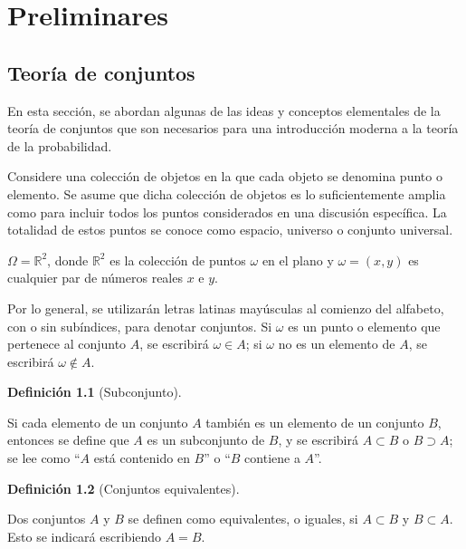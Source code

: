 \documentclass[
  us-letterpaper,
]{scrreprt}
\theoremstyle{definition}
\theoremstyle{plain}
\theoremstyle{plain}
\theoremstyle{definition}
\newtheorem{definition}{Definición}[chapter]
\theoremstyle{remark}
\begin{document}
\part{Preliminares}

\chapter{Teoría de conjuntos}\label{teoruxeda-de-conjuntos}

En esta sección, se abordan algunas de las ideas y conceptos elementales
de la teoría de conjuntos que son necesarios para una introducción
moderna a la teoría de la probabilidad.

Considere una colección de objetos en la que cada objeto se denomina
punto o elemento. Se asume que dicha colección de objetos es lo
suficientemente amplia como para incluir todos los puntos considerados
en una discusión específica. La totalidad de estos puntos se conoce como
espacio, universo o conjunto universal.

\(\Omega = \mathbb{R}^2\), donde \(\mathbb{R}^2\) es la colección de
puntos \(\omega\) en el plano y \(\omega=(x,y)\) es cualquier par de
números reales \(x\) e \(y\).

Por lo general, se utilizarán letras latinas mayúsculas al comienzo del
alfabeto, con o sin subíndices, para denotar conjuntos. Si \(\omega\) es
un punto o elemento que pertenece al conjunto \(A\), se escribirá
\(\omega \in A\); si \(\omega\) no es un elemento de \(A\), se escribirá
\(\omega \notin A\).

\begin{definition}[Subconjunto]\protect\hypertarget{def-sub}{}\label{def-sub}

Si cada elemento de un conjunto \(A\) también es un elemento de un
conjunto \(B\), entonces se define que \(A\) es un subconjunto de \(B\),
y se escribirá \(A\subset B\) o \(B\supset A\); se lee como ``\(A\) está
contenido en \(B\)'' o ``\(B\) contiene a \(A\)''.

\end{definition}

\begin{definition}[Conjuntos
equivalentes]\protect\hypertarget{def-ce}{}\label{def-ce}

Dos conjuntos \(A\) y \(B\) se definen como equivalentes, o iguales, si
\(A\subset B\) y \(B\subset A\). Esto se indicará escribiendo \(A=B\).

\end{definition}
\end{document}
